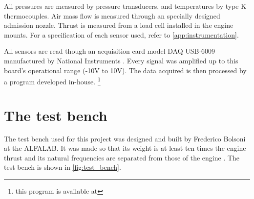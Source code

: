 \documentclass[tcc]{subfiles}
\begin{document}
All pressures are measured by pressure transducers, and temperatures by type K thermocouples. 
Air mass flow is measured through an specially designed admission nozzle. 
Thrust is measured from a load cell installed in the engine mounts.
For a specification of each sensor used, refer to \cref{app:instrumentation}.

All sensors are read though an acquisition card 
model DAQ USB-6009 manufactured by National Instruments .
Every signal was amplified up to this board's operational range (-10V to 10V). 
The data acquired is then processed by a program developed in-house.%
\footnote{this program is available at }

\section{The test bench}

The test bench used for this project was designed and built by Frederico Bolsoni at the \gls{ALFALAB}.
It was made so that its weight is at least ten times the engine thrust 
 and its natural frequencies are separated from those of the engine \cite{bolsoni}.
The test bench is shown in \cref{fig:test_bench}.
\end{document}
